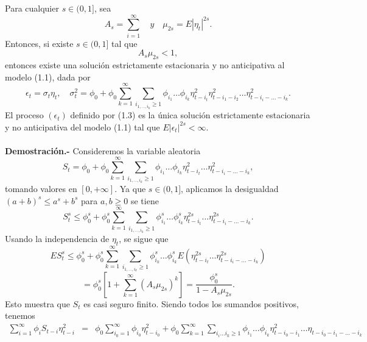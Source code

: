 \begin{teo}
    Para cualquier $s\in (0,1]$, sea 
    $$A_s = \sum_{i=1}^\infty\quad y \quad \mu_{2s}=E|\eta_t|^{2s}.$$
    Entonces, si existe $s\in (0,1]$ tal que 
    \begin{equation}
	A_s \mu_{2s}<1,
    \end{equation}
    entonces existe una solución estrictamente estacionaria y no anticipativa al modelo (1.1), dada por
    \begin{equation}
	\epsilon_t = \sigma_t \eta_t,\quad \sigma_t^2 = \phi_0 + \phi_0 \sum_{k=1}^\infty \sum_{i_{1,\ldots,i_k}\geq 1} \phi_{i_1} \ldots \phi_{i_k} \eta_{t-i_t}^2 \eta_{t-i_1 - i_2}^2 \ldots \eta_{t-i_i - \ldots - i_k}^2.
    \end{equation}
    El proceso $(\epsilon_t)$ definido por (1.3) es la única solución estrictamente estacionaria y no anticipativa del modelo (1.1) tal que $E|\epsilon_t|^{2s} < \infty$.\\\\
	\textbf{Demostración.-}\; Consideremos la variable aleatoria
	\begin{equation}
	    S_t = \phi_0 + \phi_0 \sum_{k=1}^\infty \sum_{i_{1,\ldots,i_k}\geq 1} \phi_{i_1} \ldots \phi_{i_k} \eta_{t-i_t}^2 \ldots \eta_{t-i_i - \ldots - i_k}^2,
	\end{equation}
	tomando valores en $[0,+\infty]$. Ya que $s\in (0,1]$, aplicamos la desigualdad $(a+b)^s\leq a^s + b^s$ para $a,b\geq 0$ se tiene 
	$$S_t^s \leq \phi_0^s + \phi_0^s \sum_{k=1}^\infty \sum_{i_{1,\ldots,i_k}\geq 1} \phi^s_{i_1} \ldots \phi^s_{i_k} \eta_{t-i_t}^{2s} \ldots \eta_{t-i_i - \ldots - i_k}^{2s}.$$
	Usando la independencia de $\eta_t$, se sigue que 
	$$ES_t^s \leq \phi_0^s + \phi_0^s \sum_{k=1}^\infty \sum_{i_{1,\ldots,i_k}\geq 1} \phi_{i_k}^s \ldots \phi_{i_k}^s E(\eta_{t-i_t}^{2s} \ldots \eta_{t-i_i - \ldots - i_k}^{2s})$$
	\begin{equation}
	    = \phi_0^s \left[1 + \sum_{k=1}^\infty (A_s \mu_{2s})^k\right] = \dfrac{\phi_0^s}{1-A_s\mu_{2s}}.
	\end{equation}
	Esto muestra que $S_t$ es casi seguro finito. Siendo todos los sumandos positivos, tenemos
	$$\begin{array}{rcl}
	    \sum\limits_{i=1}^\infty \phi_i S_{t-i} \eta_{t-i}^2 & = & \phi_0 \sum\limits_{i_0=1}^\infty \phi_{i_0} \eta_{t-i_0}^2 + \phi_0 \sum\limits_{k=1}^\infty \sum\limits_{i_i \ldots i_k \geq 1} \phi_{i_1}\ldots \phi_{i_k} \eta^2_{t-i_0-i_1}\ldots \eta_{t-i_0  - i_1 - \ldots - i_k}\\\\

\end{array}$$
\end{teo}
